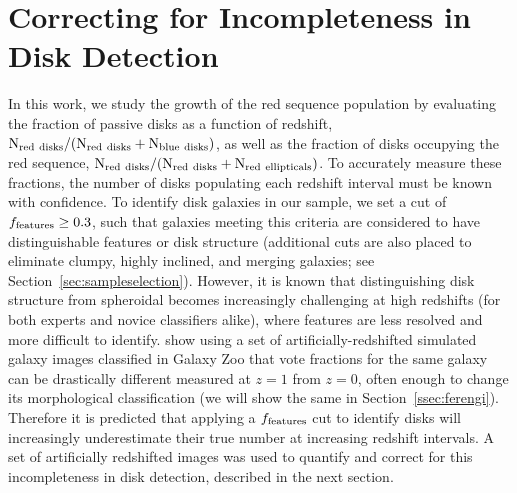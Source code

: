 \documentclass[useAMS,usenatbib]{mn2e}
\begin{document}
\section{Correcting for Incompleteness in Disk Detection}
\label{sec:correction}
In this work, we study the growth of the red sequence population by evaluating the fraction of passive disks as a function of redshift, $\rm N_{red~disks}/(N_{red~disks}+N_{blue~disks})$, as well as the fraction of disks occupying the red sequence, $\rm N_{red~disks}/(N_{red~disks}+N_{red~ellipticals})$. To accurately measure these fractions, the number of disks populating each redshift interval must be known with confidence. To identify disk galaxies in our sample, we set a cut of $f_{\rm features}\ge0.3$, such that galaxies meeting this criteria are considered to have distinguishable features or disk structure (additional cuts are also placed to eliminate clumpy, highly inclined, and merging galaxies; see Section~\ref{sec:sampleselection}). However, it is known that distinguishing disk structure from spheroidal becomes increasingly challenging at high redshifts (for both experts and novice classifiers alike), where features are less resolved and more difficult to identify. \citet{Willett2016} show using a set of artificially-redshifted simulated galaxy images classified in Galaxy Zoo that vote fractions for the same galaxy can be drastically different measured at $z=1$ from $z=0$, often enough to change its morphological classification (we will show the same in Section~\ref{ssec:ferengi}).  Therefore it is predicted that applying a $f_{\rm features}$ cut to identify disks will increasingly underestimate their true number at increasing redshift intervals. A set of artificially redshifted images was used to quantify and correct for this incompleteness in disk detection, described in the next section.
 
\end{document}
